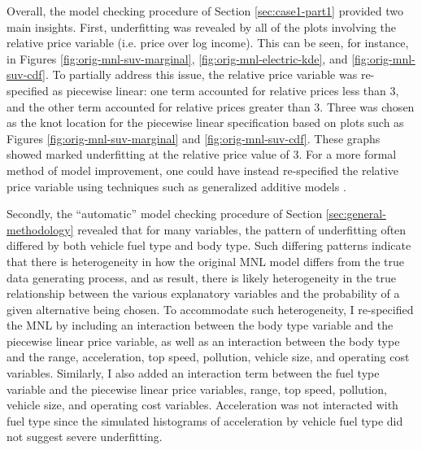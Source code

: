\documentclass[preprint]{elsarticle}
\begin{document}
Overall, the model checking procedure of Section \ref{sec:case1-part1} provided two main insights. First, underfitting was revealed by all of the plots involving the relative price variable (i.e. price over log income). This can be seen, for instance, in Figures \ref{fig:orig-mnl-suv-marginal}, \ref{fig:orig-mnl-electric-kde}, and \ref{fig:orig-mnl-suv-cdf}. To partially address this issue, the relative price variable was re-specified as piecewise linear: one term accounted for relative prices less than 3, and the other term accounted for relative prices greater than 3. Three was chosen as the knot location for the piecewise linear specification based on plots such as Figures \ref{fig:orig-mnl-suv-marginal} and \ref{fig:orig-mnl-suv-cdf}. These graphs showed marked underfitting at the relative price value of 3. For a more formal method of model improvement, one could have instead re-specified the relative price variable using techniques such as generalized additive models \citep{hastie_generalized_1986, abe_generalized_1999}.

Secondly, the ``automatic'' model checking procedure of Section \ref{sec:general-methodology} revealed that for many variables, the pattern of underfitting often differed by both vehicle fuel type and body type. Such differing patterns indicate that there is heterogeneity in how the original MNL model differs from the true data generating process, and as result, there is likely heterogeneity in the true relationship between the various explanatory variables and the probability of a given alternative being chosen. To accommodate such heterogeneity, I re-specified the MNL by including an interaction between the body type variable and the piecewise linear price variable, as well as an interaction between the body type and the range, acceleration, top speed, pollution, vehicle size, and operating cost variables. Similarly, I also added an interaction term between the fuel type variable and the piecewise linear price variables, range, top speed, pollution, vehicle size, and operating cost variables. Acceleration was not interacted with fuel type since the simulated histograms of acceleration by vehicle fuel type did not suggest severe underfitting.
\end{document}
